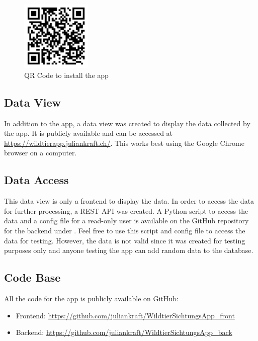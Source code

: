 \documentclass{josis}
\begin{document}
\begin{figure}[tbh]
    \centering
    \includegraphics[width=0.3\textwidth]{images/qr_code_app.png}
    \caption{QR Code to install the app}\label{fig:qr_code_app}
\end{figure}

\subsection{Data View}

In addition to the app, a data view was created to display the data collected by the app. It is publicly available and can be 
accessed at \url{https://wildtierapp.juliankraft.ch/}. This works best using the Google Chrome browser on a computer.

\subsection{Data Access}

This data view is only a frontend to display the data. In order to access the data for further processing, a REST API was created.
A Python script to access the data and a config file for a read-only user is available on the GitHub repository 
for the backend under .
Feel free to use this script and config file to access the data for testing. However, the data is not valid since it was created for testing purposes only
and anyone testing the app can add random data to the database.

\subsection{Code Base}
All the code for the app is publicly available on GitHub:
\begin{itemize}
    \item Frontend: \url{https://github.com/juliankraft/WildtierSichtungsApp_front}
    \item Backend: \url{https://github.com/juliankraft/WildtierSichtungsApp_back}
\end{itemize}
\end{document}
